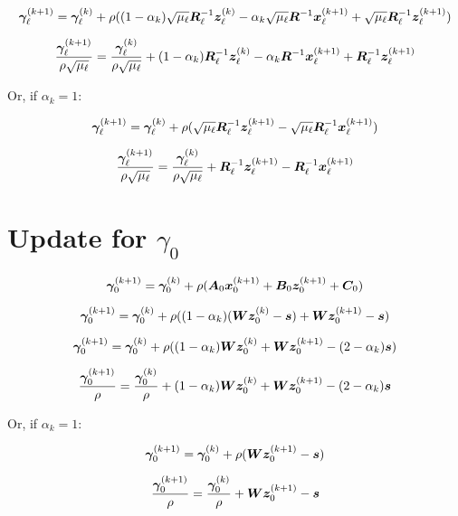 \documentclass{article}
\begin{document}
\begin{equation}
\bm{\gamma}_{\ell}^{(k + 1)} = \bm{\gamma}_{\ell}^{(k)} + \rho((1 - \alpha_k)\sqrt{\mu_{\ell}}\bm{R}_{\ell}^{-1}\bm{z}_{\ell}^{(k)} - \alpha_k\sqrt{\mu_{\ell}}\bm{R}^{-1}\bm{x}_{\ell}^{(k + 1)} + \sqrt{\mu_{\ell}}\bm{R}_{\ell}^{-1}\bm{z}_{\ell}^{(k + 1)})
\end{equation}

\begin{equation}
\frac{\bm{\gamma}_{\ell}^{(k + 1)}}{\rho\sqrt{\mu_{\ell}}} = \frac{\bm{\gamma}_{\ell}^{(k)}}{\rho\sqrt{\mu_{\ell}}} + (1 - \alpha_k)\bm{R}_{\ell}^{-1}\bm{z}_{\ell}^{(k)} - \alpha_k\bm{R}^{-1}\bm{x}_{\ell}^{(k + 1)} + \bm{R}_{\ell}^{-1}\bm{z}_{\ell}^{(k + 1)}
\end{equation}

Or, if $\alpha_k = 1$:

\begin{equation}
\bm{\gamma}_{\ell}^{(k + 1)} = \bm{\gamma}_{\ell}^{(k)} + \rho(\sqrt{\mu_{\ell}}\bm{R}_{\ell}^{-1}\bm{z}_{\ell}^{(k + 1)} - \sqrt{\mu_{\ell}}\bm{R}_{\ell}^{-1}\bm{x}_{\ell}^{(k + 1)}) 
\end{equation}

\begin{equation}
\frac{\bm{\gamma}_{\ell}^{(k + 1)}}{\rho\sqrt{\mu_{\ell}}} = \frac{\bm{\gamma}_{\ell}^{(k)}}{\rho\sqrt{\mu_{\ell}}} + \bm{R}_{\ell}^{-1}\bm{z}_{\ell}^{(k + 1)} - \bm{R}_{\ell}^{-1}\bm{x}_{\ell}^{(k + 1)}
\end{equation}

\section{Update for $\gamma_0$}
\begin{equation}
\bm{\gamma}_0^{(k + 1)} = \bm{\gamma}_0^{(k)} + \rho(\bm{A}_0\bm{x}_0^{(k + 1)} + \bm{B}_0\bm{z}_0^{(k + 1)} + \bm{C}_0)
\end{equation}

\begin{equation}
\bm{\gamma}_0^{(k + 1)} = \bm{\gamma}_0^{(k)} + \rho((1 - \alpha_k)(\bm{W}\bm{z}_0^{(k)} - \bm{s}) + \bm{W}\bm{z}_0^{(k + 1)} - \bm{s})
\end{equation}

\begin{equation}
\bm{\gamma}_0^{(k + 1)} = \bm{\gamma}_0^{(k)} + \rho((1 - \alpha_k)\bm{W}\bm{z}_0^{(k)} + \bm{W}\bm{z}_0^{(k + 1)} - (2 - \alpha_k)\bm{s})
\end{equation}

\begin{equation}
\frac{\bm{\gamma}_0^{(k + 1)}}{\rho} = \frac{\bm{\gamma}_0^{(k)}}{\rho} + (1 - \alpha_k)\bm{W}\bm{z}_0^{(k)} + \bm{W}\bm{z}_0^{(k + 1)} - (2 - \alpha_k)\bm{s}
\end{equation}

Or, if $\alpha_k = 1$:

\begin{equation}
\bm{\gamma}_0^{(k + 1)} = \bm{\gamma}_0^{(k)} + \rho(\bm{W}\bm{z}_0^{(k + 1)} - \bm{s})
\end{equation}

\begin{equation}
\frac{\bm{\gamma}_0^{(k + 1)}}{\rho} = \frac{\bm{\gamma}_0^{(k)}}{\rho} + \bm{W}\bm{z}_0^{(k + 1)} - \bm{s}
\end{equation}
\end{document}
